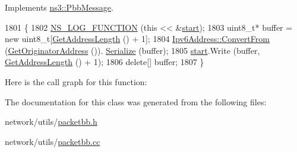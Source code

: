 Implements \hyperlink{classns3_1_1PbbMessage_ab224036cc9b2318b2ec8c11b9e439dee}{ns3\+::\+Pbb\+Message}.


\begin{DoxyCode}
1801 \{
1802   \hyperlink{log-macros-disabled_8h_a90b90d5bad1f39cb1b64923ea94c0761}{NS\_LOG\_FUNCTION} (\textcolor{keyword}{this} << &\hyperlink{namespacevisualizer_1_1core_a2a35e5d8a34af358b508dac8635754e0}{start});
1803   uint8\_t* buffer = \textcolor{keyword}{new} uint8\_t[\hyperlink{classns3_1_1PbbMessageIpv6_a54ed2d6cd8da2fb35533b5d0755fbb68}{GetAddressLength} () + 1];
1804   \hyperlink{classns3_1_1Ipv6Address_ac00bc221a0b226b2090d05468aec4b79}{Ipv6Address::ConvertFrom} (\hyperlink{classns3_1_1PbbMessage_a28eaf6a89ecf70e54ecf4ae11971f074}{GetOriginatorAddress} ()).
      \hyperlink{classns3_1_1Ipv6Address_adf5b453892de2893a371380ab299db88}{Serialize} (buffer);
1805   \hyperlink{namespacevisualizer_1_1core_a2a35e5d8a34af358b508dac8635754e0}{start}.Write (buffer, \hyperlink{classns3_1_1PbbMessageIpv6_a54ed2d6cd8da2fb35533b5d0755fbb68}{GetAddressLength} () + 1);
1806   \textcolor{keyword}{delete}[] buffer;
1807 \}
\end{DoxyCode}


Here is the call graph for this function\+:




The documentation for this class was generated from the following files\+:\begin{DoxyCompactItemize}
\item 
network/utils/\hyperlink{packetbb_8h}{packetbb.\+h}\item 
network/utils/\hyperlink{packetbb_8cc}{packetbb.\+cc}\end{DoxyCompactItemize}
